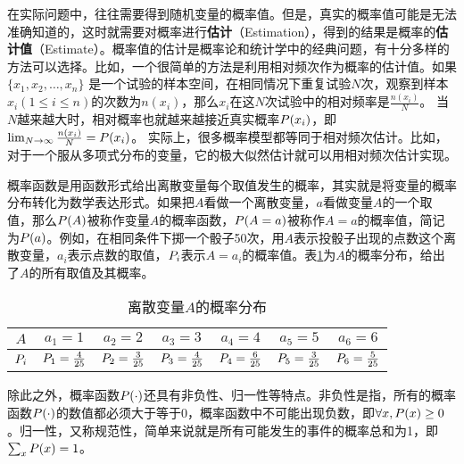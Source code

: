 \parinterval 在实际问题中，往往需要得到随机变量的概率值。但是，真实的概率值可能是无法准确知道的，这时就需要对概率进行{\small\sffamily\bfseries{估计}}（Estimation），得到的结果是概率的{\small\sffamily\bfseries{估计值}}（Estimate）。概率值的估计是概率论和统计学中的经典问题，有十分多样的方法可以选择。比如，一个很简单的方法是利用相对频次作为概率的估计值。如果$\{x_1,x_2,\dots,x_n \}$ 是一个试验的样本空间，在相同情况下重复试验$N$次，观察到样本$x_i (1\leq{i}\leq{n})$的次数为$n (x_i )$，那么$x_i$在这$N$次试验中的相对频率是$\frac{n(x_i )}{N}$。 当$N$越来越大时，相对概率也就越来越接近真实概率${P}(x_i)$，即$\lim_{N \to \infty}\frac{n(x_i )}{N}={P}(x_i)$。 实际上，很多概率模型都等同于相对频次估计。比如，对于一个服从多项式分布的变量，它的极大似然估计就可以用相对频次估计实现。

\parinterval 概率函数是用函数形式给出离散变量每个取值发生的概率，其实就是将变量的概率分布转化为数学表达形式。如果把$A$看做一个离散变量，$a$看做变量$A$的一个取值，那么${P}(A)$被称作变量$A$的概率函数，${P}(A=a)$被称作$A = a$的概率值，简记为${P}(a)$。例如，在相同条件下掷一个骰子50次，用$A$表示投骰子出现的点数这个离散变量，$a_i$表示点数的取值，${P}_i$表示$A=a_i$的概率值。表\ref{tab:2-1}为$A$的概率分布，给出了$A$的所有取值及其概率。

\begin{table}[htp]
\centering
\caption{离散变量$A$的概率分布}
\begin{tabular}{c|c c c c c c}
\rule{0pt}{15pt}     $A$ & $a_1=1$ & $a_2=2$ & $a_3=3$ & $a_4=4$ & $a_5=5$ & $a_6=6$\\
               \hline
\rule{0pt}{15pt}     ${P}_i$ & ${P}_1=\frac{4}{25}$  &  ${P}_2=\frac{3}{25}$ &  ${P}_3=\frac{4}{25}$ & ${P}_4=\frac{6}{25}$ & ${P}_5=\frac{3}{25}$ & ${P}_6=\frac{5}{25}$  \\
             \end{tabular}
             \label{tab:2-1}
\end{table}

\parinterval 除此之外，概率函数${P}(\cdot)$还具有非负性、归一性等特点。非负性是指，所有的概率函数${P}(\cdot)$的数值都必须大于等于0，概率函数中不可能出现负数，即$\forall{x},{P}{(x)}\geq{0}$。归一性，又称规范性，简单来说就是所有可能发生的事件的概率总和为1，即$\sum_{x}{P}{(x)}={1}$。

